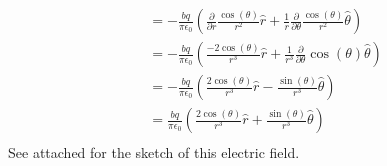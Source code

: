 \documentclass[11pt]{article}
\numberwithin{equation}{section}
\begin{document}
\begin{enumerate}[(i)]
\begin{align*}
&=  -\frac{bq}{\pi\epsilon_0}\left(\frac{\partial}{\partial r}\frac{\cos(\theta)}{r^2}\hat{r}+\frac{1}{r}\frac{\partial}{\partial \theta}\frac{\cos(\theta)}{r^2}\hat{\theta}\right)\\
&=  -\frac{bq}{\pi\epsilon_0}\left(\frac{-2\cos(\theta)}{r^3}\hat{r}+\frac{1}{r^3}\frac{\partial}{\partial \theta}{\cos(\theta)}\hat{\theta}\right)\\
&=  -\frac{bq}{\pi\epsilon_0}\left(\frac{2\cos(\theta)}{r^3}\hat{r}-\frac{\sin(\theta)}{r^3}\hat{\theta}\right)\\
&=  \frac{bq}{\pi\epsilon_0}\left(\frac{2\cos(\theta)}{r^3}\hat{r}+\frac{\sin(\theta)}{r^3}\hat{\theta}\right)\\
\end{align*}
See attached for the sketch of this electric field.
\end{enumerate}
\end{document}
